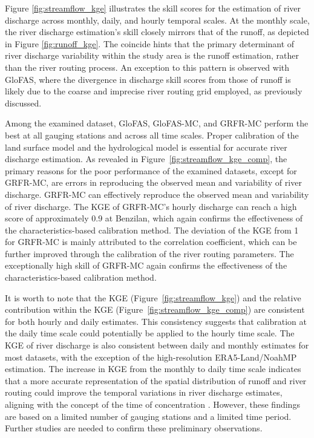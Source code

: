 \documentclass[preprint, review, authoryear, longtitle, 12pt, 3p]{elsarticle}
\begin{document}
Figure \ref{fig:streamflow_kge} illustrates the skill scores for the estimation of river discharge across monthly, daily, and hourly temporal scales. At the monthly scale, the river discharge estimation's skill closely mirrors that of the runoff, as depicted in Figure \ref{fig:runoff_kge}. The coincide hints that the primary determinant of river discharge variability within the study area is the runoff estimation, rather than the river routing process. An exception to this pattern is observed with GloFAS, where the divergence in discharge skill scores from those of runoff is likely due to the coarse and imprecise river routing grid employed, as previously discussed.

Among the examined dataset, GloFAS, GloFAS-MC, and GRFR-MC perform the best at all gauging stations and across all time scales. Proper calibration of the land surface model and the hydrological model is essential for accurate river discharge estimation. As revealed in Figure~\ref{fig:streamflow_kge_comp}, the primary reasons for the poor performance of the examined datasets, except for GRFR-MC, are errors in reproducing the observed mean and variability of river discharge. GRFR-MC can effectively reproduce the observed mean and variability of river discharge. The KGE of GRFR-MC's hourly discharge can reach a high score of approximately 0.9 at Benzilan, which again confirms the effectiveness of the characteristics-based calibration method. The deviation of the KGE from 1 for GRFR-MC is mainly attributed to the correlation coefficient, which can be further improved through the calibration of the river routing parameters. The exceptionally high skill of GRFR-MC again confirms the effectiveness of the characteristics-based calibration method.

It is worth to note that the KGE (Figure~\ref{fig:streamflow_kge}) and the relative contribution within the KGE (Figure~\ref{fig:streamflow_kge_comp}) are consistent for both hourly and daily estimates. This consistency suggests that calibration at the daily time scale could potentially be applied to the hourly time scale. The KGE of river discharge is also consistent between daily and monthly estimates for most datasets, with the exception of the high-resolution ERA5-Land/NoahMP estimation. The increase in KGE from the monthly to daily time scale indicates that a more accurate representation of the spatial distribution of runoff and river routing could improve the temporal variations in river discharge estimates, aligning with the concept of the time of concentration \citep{beven2020HESS}. However, these findings are based on a limited number of gauging stations and a limited time period. Further studies are needed to confirm these preliminary observations.
\end{document}
